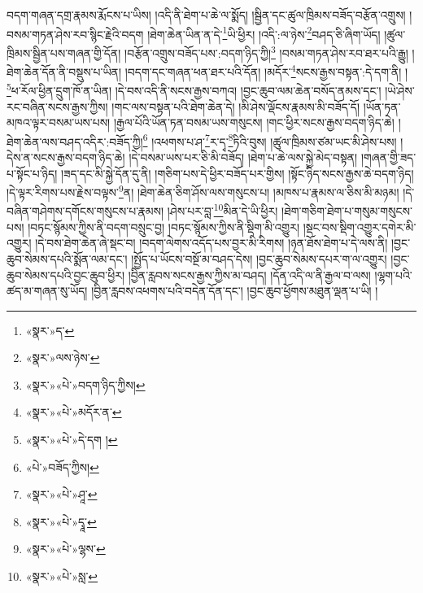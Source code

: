 \documentclass[12pt,a4paper]{book}
\begin{document}
བདག་གཞན་དགྲ་རྣམས་རྨོངས་པ་ཡིས། །འདི་ནི་ཐེག་པ་ཆེ་ལ་སྨོད། །སྦྱིན་དང་ཚུལ་ཁྲིམས་བཟོད་བརྩོན་འགྲུས། །བསམ་གཏན་ཤེས་རབ་སྙིང་རྗེའི་བདག །ཐེག་ཆེན་ཡིན་ན་དེ་\footnote{«སྣར་»ད་}ཡི་ཕྱིར། །འདི་:ལ་ཉེས་\footnote{«སྣར་»ལས་ཉེས་}བཤད་ཅི་ཞིག་ཡོད། །ཚུལ་ཁྲིམས་སྦྱིན་པས་གཞན་གྱི་དོན། །བརྩོན་འགྲུས་བཟོད་པས་:བདག་ཉིད་ཀྱི།\footnote{«སྣར་»«པེ་»བདག་ཉིད་ཀྱིས།} །བསམ་གཏན་ཤེས་རབ་ཐར་པའི་རྒྱུ། །ཐེག་ཆེན་དོན་ནི་བསྡུས་པ་ཡིན། །བདག་དང་གཞན་ཕན་ཐར་པའི་དོན། །མདོར་\footnote{«སྣར་»«པེ་»མདོར་ན་}སངས་རྒྱས་བསྟན་:དེ་དག་ནི། །\footnote{«སྣར་»«པེ་»དེ་དག །}ཕ་རོལ་ཕྱིན་དྲུག་ཁོ་ན་ཡིན། །དེ་བས་འདི་ནི་སངས་རྒྱས་བཀའ། །བྱང་ཆུབ་ལམ་ཆེན་བསོད་ནམས་དང་། །ཡེ་ཤེས་རང་བཞིན་སངས་རྒྱས་ཀྱིས། །གང་ལས་བསྟན་པའི་ཐེག་ཆེན་དེ། །མི་ཤེས་ལྡོངས་རྣམས་མི་བཟོད་དོ། །ཡོན་ཏན་མཁའ་ལྟར་བསམ་ཡས་པས། །རྒྱལ་པོའི་ཡོན་ཏན་བསམ་ཡས་གསུངས། །གང་ཕྱིར་སངས་རྒྱས་བདག་ཉིད་ཆེ། །ཐེག་ཆེན་ལས་བཤད་འདིར་:བཟོད་ཀྱི།\footnote{«པེ་»བཟོད་ཀྱིས།} །འཕགས་པ་ཤ་\footnote{«སྣར་»«པེ་»ཤཱ་}ར་དྭ་\footnote{«སྣར་»«པེ་»དྭཱ་}ཏིའི་བུས། །ཚུལ་ཁྲིམས་ཙམ་ཡང་མི་ཤེས་པས། །དེས་ན་སངས་རྒྱས་བདག་ཉིད་ཆེ། །དེ་བསམ་ཡས་པར་ཅི་མི་བཟོད། །ཐེག་པ་ཆེ་ལས་སྐྱེ་མེད་བསྟན། །གཞན་གྱི་ཟད་པ་སྟོང་པ་ཉིད། །ཟད་དང་མི་སྐྱེ་དོན་དུ་ནི། །གཅིག་པས་དེ་ཕྱིར་བཟོད་པར་གྱིས། །སྟོང་ཉིད་སངས་རྒྱས་ཆེ་བདག་ཉིད། །དེ་ལྟར་རིགས་པས་རྗེས་བལྟས་\footnote{«སྣར་»«པེ་»ལྷས་}ན། །ཐེག་ཆེན་ཅིག་ཤོས་ལས་གསུངས་པ། །མཁས་པ་རྣམས་ལ་ཅིས་མི་མཉམ། །དེ་བཞིན་གཤེགས་དགོངས་གསུངས་པ་རྣམས། །ཤེས་པར་བླ་\footnote{«སྣར་»«པེ་»སླ་}མིན་དེ་ཡི་ཕྱིར། །ཐེག་གཅིག་ཐེག་པ་གསུམ་གསུངས་པས། །བཏང་སྙོམས་ཀྱིས་ནི་བདག་བསྲུང་བྱ། །བཏང་སྙོམས་ཀྱིས་ནི་སྡིག་མི་འགྱུར། །སྡང་བས་སྡིག་འགྱུར་དགེར་མི་འགྱུར། །དེ་བས་ཐེག་ཆེན་ཞེ་སྡང་བ། །བདག་ལེགས་འདོད་པས་བྱར་མི་རིགས། །ཉན་ཐོས་ཐེག་པ་དེ་ལས་ནི། །བྱང་ཆུབ་སེམས་དཔའི་སྨོན་ལམ་དང་། །སྤྱོད་པ་ཡོངས་བསྔོ་མ་བཤད་དེས། །བྱང་ཆུབ་སེམས་དཔར་ག་ལ་འགྱུར། །བྱང་ཆུབ་སེམས་དཔའི་བྱང་ཆུབ་ཕྱིར། །བྱིན་རླབས་སངས་རྒྱས་ཀྱིས་མ་བཤད། །དོན་འདི་ལ་ནི་རྒྱལ་བ་ལས། །ལྷག་པའི་ཚད་མ་གཞན་སུ་ཡོད། །བྱིན་རླབས་འཕགས་པའི་བདེན་དོན་དང་། །བྱང་ཆུབ་ཕྱོགས་མཐུན་ལྡན་པ་ཡི། །
\end{document}
